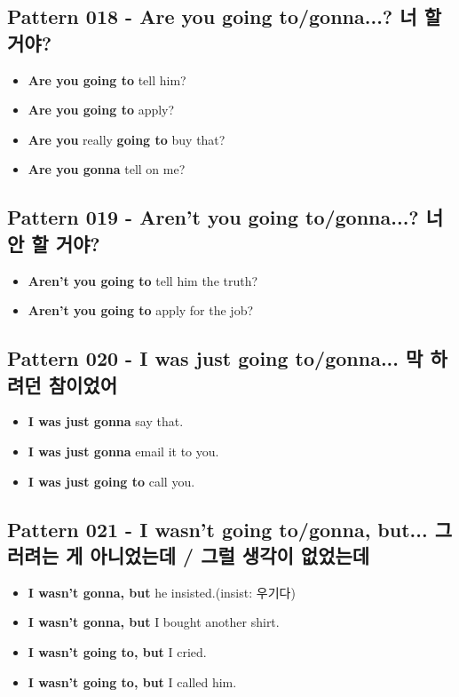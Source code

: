 \documentclass[11pt]{oblivoir}
\begin{document}
\subsection{Pattern 018 - Are you going to/gonna...? 너 \texttildelow 할 거야?}
\begin{itemize}
  \item \textbf{Are you going to} tell him?
  \item \textbf{Are you going to} apply?
  \item \textbf{Are you} really \textbf{going to} buy that?
  \item \textbf{Are you gonna} tell on me?
\end{itemize}

\subsection{Pattern 019 - Aren't you going to/gonna...? 너 \texttildelow 안 할 거야?}
\begin{itemize}
  \item \textbf{Aren't you going to} tell him the truth?
  \item \textbf{Aren't you going to} apply for the job?
\end{itemize}

\subsection{Pattern 020 - I was just going to/gonna... 막 \texttildelow 하려던 참이었어}
\begin{itemize}
  \item \textbf{I was just gonna} say that.
  \item \textbf{I was just gonna} email it to you.
  \item \textbf{I was just going to} call you.
\end{itemize}

\subsection{Pattern 021 - I wasn't going to/gonna, but... 그러려는 게 아니었는데 \texttildelow / 그럴 생각이 없었는데 \texttildelow}
\begin{itemize}
  \item \textbf{I wasn't gonna, but} he insisted.(insist: 우기다)
  \item \textbf{I wasn't gonna, but} I bought another shirt.
  \item \textbf{I wasn't going to, but} I cried.
  \item \textbf{I wasn't going to, but} I called him.
\end{itemize}
\end{document}
